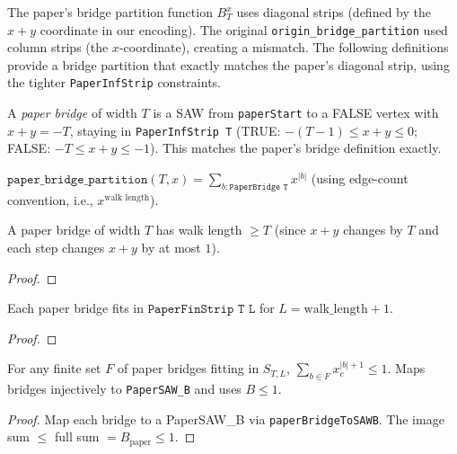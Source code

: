 The paper's bridge partition function $B_T^x$ uses diagonal strips
(defined by the $x+y$ coordinate in our encoding). The original
\texttt{origin\_bridge\_partition} used column strips (the $x$-coordinate),
creating a mismatch. The following definitions provide a bridge partition
that exactly matches the paper's diagonal strip, using the tighter
\texttt{PaperInfStrip} constraints.

\begin{definition}\label{def:paper_bridge}
\leanok
{}
  A \emph{paper bridge} of width $T$ is a SAW from \texttt{paperStart}
  to a FALSE vertex with $x+y = -T$, staying in \texttt{PaperInfStrip T}
  (TRUE: $-(T{-}1) \leq x{+}y \leq 0$; FALSE: $-T \leq x{+}y \leq -1$).
  This matches the paper's bridge definition exactly.
\end{definition}

\begin{definition}\label{def:paper_bridge_partition}
\leanok
{}
  $\texttt{paper\_bridge\_partition}(T, x) = \sum_{b : \texttt{PaperBridge T}} x^{|b|}$
  (using edge-count convention, i.e., $x^{\text{walk length}}$).
\end{definition}

\begin{lemma}\label{lem:paper_bridge_length}
\leanok
{}
  A paper bridge of width $T$ has walk length $\geq T$
  (since $x+y$ changes by $T$ and each step changes $x+y$ by at most $1$).
\end{lemma}
\begin{proof}
\leanok
\end{proof}

\begin{lemma}\label{lem:paper_bridge_fin_strip}
\leanok
{}
  Each paper bridge fits in $\texttt{PaperFinStrip T L}$ for
  $L = \text{walk\_length} + 1$.
\end{lemma}
\begin{proof}
\leanok
\end{proof}

\begin{lemma}\label{lem:paper_bridge_shifted}
\leanok
{}
  For any finite set $F$ of paper bridges fitting in $S_{T,L}$,
  $\sum_{b \in F} x_c^{|b|+1} \leq 1$.
  Maps bridges injectively to \texttt{PaperSAW\_B} and uses $B \leq 1$.
\end{lemma}
\begin{proof}
\leanok
{}
  Map each bridge to a PaperSAW\_B via \texttt{paperBridgeToSAWB}.
  The image sum $\leq$ full sum $= B_{\text{paper}} \leq 1$.
\end{proof}

